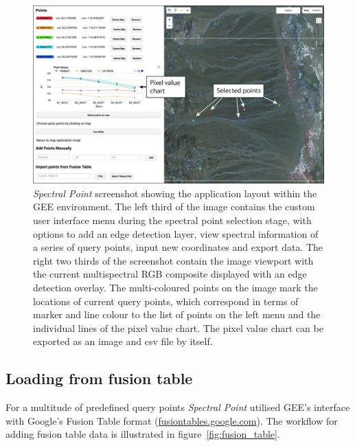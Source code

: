 \documentclass[12pt]{article}
\begin{document}
\vspace{2em}

\begin{figure}[htbp]
\centering
\includegraphics[width=1.0\textwidth]{images/select_points_reduced.jpg}
\caption{\textit{Spectral Point} screenshot showing the application layout within the GEE environment. The left third of the image contains the custom user interface menu during the spectral point selection stage, with options to add an edge detection layer, view spectral information of a series of query points, input new coordinates and export data. The right two thirds of the screenshot contain the image viewport with the current multispectral RGB composite displayed with an edge detection overlay. The multi-coloured points on the image mark the locations of current query points, which correspond in terms of marker and line colour to the list of points on the left menu and the individual lines of the pixel value chart. The pixel value chart can be exported as an image and csv file by itself.}
\label{fig:select_points}
\end{figure}

\subsection{Loading from fusion table}
\label{sec:fusion_table}

For a multitude of predefined query points \textit{Spectral Point} utilised GEE's interface with Google's Fusion Table format (\href{https://fusiontables.google.com}{fusiontables.google.com}). The workflow for adding fusion table data is illustrated in figure~\ref{fig:fusion_table}.
\end{document}
